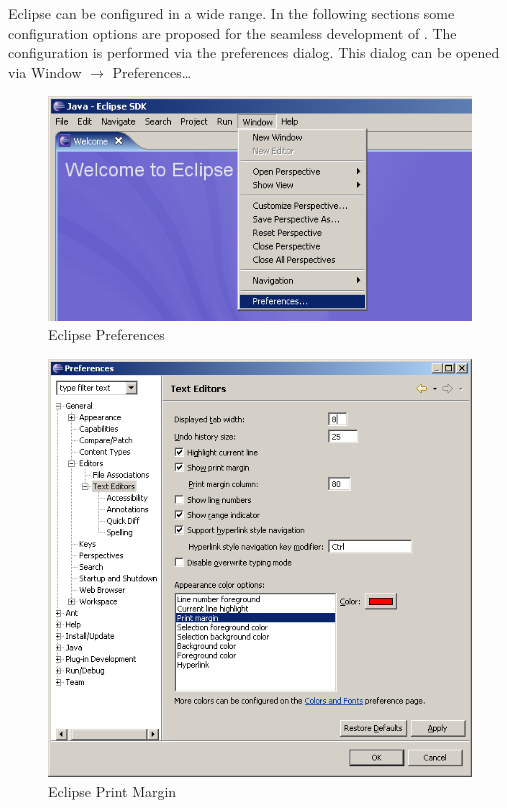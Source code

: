 \documentclass{extex-doc}
\newcommand\menu{\textsf}
\newcommand\sub{\(\rightarrow\) }
\begin{document}
Eclipse can be configured in a wide range. In the following sections
some configuration options are proposed for the seamless development
of \ExTeX. The configuration is performed via the preferences dialog.
This dialog can be opened via \menu{Window \sub Preferences\ldots}
\begin{figure}[ht]
  \centering  \includegraphics[scale=.4]{image/eclipse-preferences}
  \caption{Eclipse Preferences}\label{fig:eclipse-preferences}
\end{figure}

\begin{figure}[ht]
  \centering  \includegraphics[scale=.4]{image/eclipse-print-margin}
  \caption{Eclipse Print Margin}\label{fig:eclipse-print-margin}
\end{figure}
\end{document}
